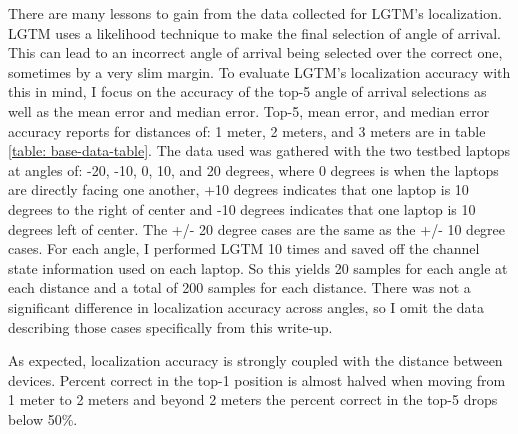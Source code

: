 \documentclass[12pt]{report}
\begin{document}
There are many lessons to gain from the data collected for LGTM's localization. LGTM uses a likelihood technique to make the final selection of angle of arrival. This can lead to an incorrect angle of arrival being selected over the correct one, sometimes by a very slim margin. To evaluate LGTM's localization accuracy with this in mind, I focus on the accuracy of the top-5 angle of arrival selections as well as the mean error and median error. Top-5, mean error, and median error accuracy reports for distances of: 1 meter, 2 meters, and 3 meters are in table \ref{table: base-data-table}. The data used was gathered with the two testbed laptops at angles of: -20, -10, 0, 10, and 20 degrees, where 0 degrees is when the laptops are directly facing one another, +10 degrees indicates that one laptop is 10 degrees to the right of center and -10 degrees indicates that one laptop is 10 degrees left of center. The +/- 20 degree cases are the same as the +/- 10 degree cases. For each angle, I performed LGTM 10 times and saved off the channel state information used on each laptop. So this yields 20 samples for each angle at each distance and a total of 200 samples for each distance. There was not a significant difference in localization accuracy across angles, so I omit the data describing those cases specifically from this write-up. \par 

As expected, localization accuracy is strongly coupled with the distance between devices. Percent correct in the top-1 position is almost halved when moving from 1 meter to 2 meters and beyond 2 meters the percent correct in the top-5 drops below 50\%. \par
\end{document}

